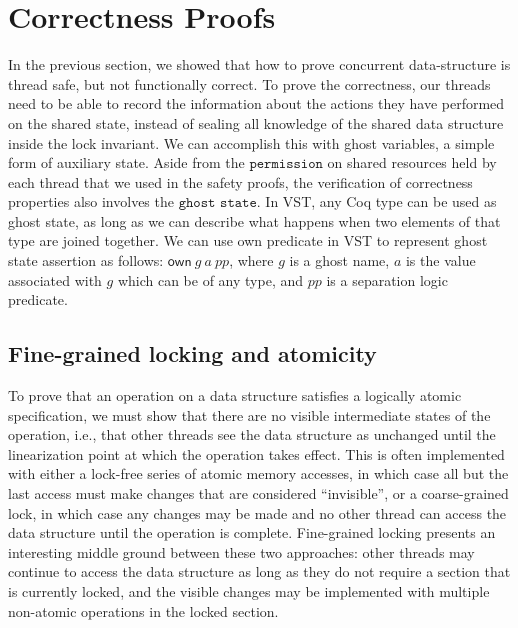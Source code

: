 \documentclass[acmsmall,screen]{acmart}\settopmatter{printfolios=true}
\begin{document}
\section{Correctness Proofs}
In the previous section, we showed that how to prove concurrent data-structure is thread safe, but not functionally correct. To prove the correctness, our threads need to be able to record the information about the actions they have performed on the shared state, instead of sealing all knowledge of the shared data structure inside the lock invariant. We can accomplish this with ghost variables, a simple form of auxiliary state. Aside from the $\texttt{permission}$ on shared resources held by each thread that we used in the safety proofs, the verification of correctness properties also involves the $\texttt{ghost state}$. In VST, any Coq type can be used as ghost state, as long as we can describe what happens when two elements of that type are joined together. We can use own predicate in VST to represent ghost state assertion as follows: $\mathsf{own}\ g\ a\ \mathit{pp}$, where $g$ is a \textsf{ghost name}, $a$ is the value associated with $g$ which can be of any type, and $\mathit{pp}$ is a separation logic predicate. 



\subsection{Fine-grained locking and atomicity}

To prove that an operation on a data structure satisfies a logically atomic specification, we must show that there are no visible intermediate states of the operation, i.e., that other threads see the data structure as unchanged until the linearization point at which the operation takes effect. This is often implemented with either a lock-free series of atomic memory accesses, in which case all but the last access must make changes that are considered ``invisible'', or a coarse-grained lock, in which case any changes may be made and no other thread can access the data structure until the operation is complete. Fine-grained locking presents an interesting middle ground between these two approaches: other threads may continue to access the data structure as long as they do not require a section that is currently locked, and the visible changes may be implemented with multiple non-atomic operations in the locked section.
\end{document}

